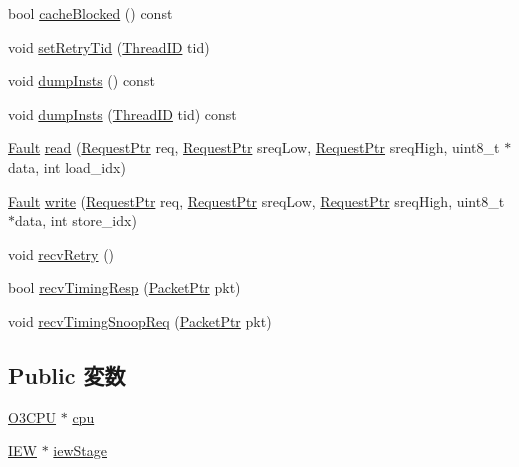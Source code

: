 \begin{DoxyCompactItemize}
\item 
bool \hyperlink{classLSQ_a050e3736ea48bf74bd0c216b1cd3f494}{cacheBlocked} () const 
\item 
void \hyperlink{classLSQ_aca00d390ba2ada0daf6e0c0a7cf75f57}{setRetryTid} (\hyperlink{base_2types_8hh_ab39b1a4f9dad884694c7a74ed69e6a6b}{ThreadID} tid)
\item 
void \hyperlink{classLSQ_ad0dcc54f6823ec37a9ab4eef289e2305}{dumpInsts} () const 
\item 
void \hyperlink{classLSQ_a720e1bd0f477c100c9c9ca0b6ced109f}{dumpInsts} (\hyperlink{base_2types_8hh_ab39b1a4f9dad884694c7a74ed69e6a6b}{ThreadID} tid) const 
\item 
\hyperlink{classRefCountingPtr}{Fault} \hyperlink{classLSQ_a206ad0283d431e78e6f38bb9b54b23ee}{read} (\hyperlink{classRequest}{RequestPtr} req, \hyperlink{classRequest}{RequestPtr} sreqLow, \hyperlink{classRequest}{RequestPtr} sreqHigh, uint8\_\-t $\ast$data, int load\_\-idx)
\item 
\hyperlink{classRefCountingPtr}{Fault} \hyperlink{classLSQ_a1be8f3ccb9b2787a2c92bfab3fda9675}{write} (\hyperlink{classRequest}{RequestPtr} req, \hyperlink{classRequest}{RequestPtr} sreqLow, \hyperlink{classRequest}{RequestPtr} sreqHigh, uint8\_\-t $\ast$data, int store\_\-idx)
\item 
void \hyperlink{classLSQ_a29cb5a4f98063ce6e9210eacbdb35298}{recvRetry} ()
\item 
bool \hyperlink{classLSQ_a482dba5588f4bee43e498875a61e5e0b}{recvTimingResp} (\hyperlink{classPacket}{PacketPtr} pkt)
\item 
void \hyperlink{classLSQ_aff3031c56fc4947a19695c868bb8233e}{recvTimingSnoopReq} (\hyperlink{classPacket}{PacketPtr} pkt)
\end{DoxyCompactItemize}
\subsection*{Public 変数}
\begin{DoxyCompactItemize}
\item 
\hyperlink{classLSQ_a44622cf06940413482836cb62931ac3f}{O3CPU} $\ast$ \hyperlink{classLSQ_a1379cf882a12ac6fc9eba5da7c84b18b}{cpu}
\item 
\hyperlink{classLSQ_a23f60a4095b5240dfcb18a4ec40210a9}{IEW} $\ast$ \hyperlink{classLSQ_a4e9ef25d8913b270d432be4bbfe4965c}{iewStage}
\end{DoxyCompactItemize}
